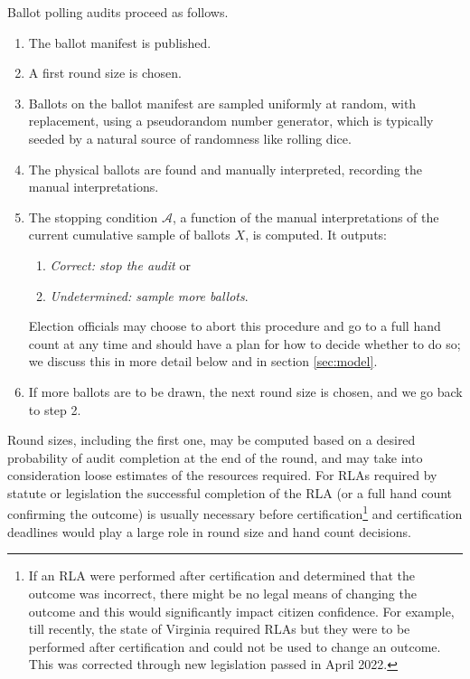 Ballot polling audits proceed as follows. 
\begin{enumerate}
\item The ballot manifest is published. 
\item A first round size \cite{usenix_minerva} is chosen. %
\item Ballots on the ballot manifest are sampled uniformly at random, with replacement, using a pseudorandom number generator, which is typically seeded by a natural source of randomness like rolling dice.
\item The physical ballots are found and manually interpreted, recording the manual interpretations. 
\item The stopping condition $\mathcal{A}$, a function of the manual interpretations of the current cumulative sample of ballots $X$, is computed. It outputs: 
\begin{enumerate}
\item \emph{Correct: stop the audit} or 
\item \emph{Undetermined: sample more ballots}. 
\end{enumerate}
Election officials may choose to abort this procedure and go to a full hand count at any time and should have a plan for how to decide whether to do so; we discuss this in more detail below and in section \ref{sec:model}.     
\item If more ballots are to be drawn, the next round size is chosen, and we go back to step 2. 
\end{enumerate} 

Round sizes, including the first one, may be computed based on a desired probability of audit completion at the end of the round, and may take into consideration loose estimates of the resources required. For RLAs required by statute or legislation the successful completion of the RLA (or a full hand count confirming the outcome) is usually necessary before certification\footnote{If an RLA were performed after certification and determined that the outcome was incorrect, there might be no legal means of changing the outcome and this would significantly impact citizen confidence. For example, till recently, the state of Virginia required RLAs but they were to be performed after certification and could not be used to change an outcome. This was corrected through new legislation passed in April 2022.} and certification deadlines would play a large role in round size and hand count decisions. 

